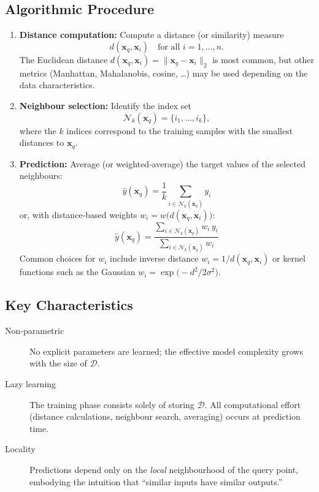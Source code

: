 \documentclass[12pt, a4paper]{article}
\begin{document}
\subsection{Algorithmic Procedure}
\begin{enumerate}
  \item \textbf{Distance computation:} Compute a distance (or similarity) measure
        \[
        d(\mathbf{x}_q,\mathbf{x}_i) \quad \text{for all } i=1,\dots ,n.
        \]
        The Euclidean distance \(d(\mathbf{x}_q,\mathbf{x}_i)=\|\mathbf{x}_q-\mathbf{x}_i\|_2\) is most common, but other metrics (Manhattan, Mahalanobis, cosine, …) may be used depending on the data characteristics.
  \item \textbf{Neighbour selection:} Identify the index set
        \[
        \mathcal{N}_k(\mathbf{x}_q)=\{i_1,\dots,i_k\},
        \]
        where the \(k\) indices correspond to the training samples with the smallest distances to \(\mathbf{x}_q\).
  \item \textbf{Prediction:} Average (or weighted‑average) the target values of the selected neighbours:
        \begin{equation}
          \boxed{\;
          \hat y(\mathbf{x}_q)=\frac{1}{k}\sum_{i\in \mathcal{N}_k(\mathbf{x}_q)} y_i
          \;}
          \label{eq:unweighted}
        \end{equation}
        or, with distance‑based weights \(w_i = w\!\bigl(d(\mathbf{x}_q,\mathbf{x}_i)\bigr)\):
        \begin{equation}
          \boxed{\;
          \hat y(\mathbf{x}_q)=
          \frac{\displaystyle\sum_{i\in \mathcal{N}_k(\mathbf{x}_q)} w_i\, y_i}
               {\displaystyle\sum_{i\in \mathcal{N}_k(\mathbf{x}_q)} w_i}
          \;}
          \label{eq:weighted}
        \end{equation}
        Common choices for \(w_i\) include inverse distance \(w_i=1/d(\mathbf{x}_q,\mathbf{x}_i)\) or kernel functions such as the Gaussian
        \(w_i=\exp\!\bigl(-d^2/2\sigma^2\bigr)\).
\end{enumerate}

\subsection{Key Characteristics}
\begin{description}
  \item[Non‑parametric] No explicit parameters are learned; the effective model complexity grows with the size of \(\mathcal{D}\).
  \item[Lazy learning] The training phase consists solely of storing \(\mathcal{D}\).  All computational effort (distance calculations, neighbour search, averaging) occurs at prediction time.
  \item[Locality] Predictions depend only on the \textit{local} neighbourhood of the query point, embodying the intuition that “similar inputs have similar outputs.”
\end{description}
\end{document}
